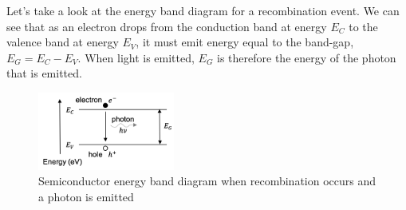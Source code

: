 Let's take a look at the energy band diagram for a recombination event. We can see that as an electron drops from the conduction band at energy $E_C$ to the valence band at energy $E_V$, it must emit energy equal to the band-gap, $E_G = E_C - E_V$. When light is emitted, $E_G$ is therefore the energy of the photon that is emitted.

	\begin{figure}[H]{
		\centering
		\includegraphics[width=0.4\textwidth]{n_led/band_diagram_photon.png}
		\caption{Semiconductor energy band diagram when recombination occurs and a photon is emitted}
		\vspace{-5mm}}
	\label{fig:BandDiagramPhoton}
\end{figure}
